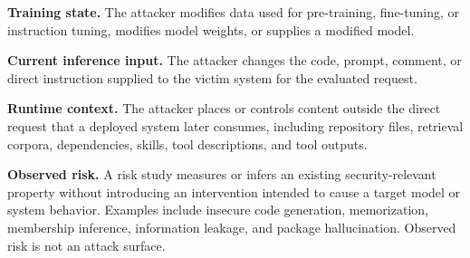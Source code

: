 \documentclass[acmsmall,screen,review]{acmart}
\begin{document}
\noindent\textbf{Training state.}
The attacker modifies data used for pre-training, fine-tuning, or instruction tuning, modifies model weights, or supplies a modified model.

\noindent\textbf{Current inference input.}
The attacker changes the code, prompt, comment, or direct instruction supplied to the victim system for the evaluated request.

\noindent\textbf{Runtime context.}
The attacker places or controls content outside the direct request that a deployed system later consumes, including repository files, retrieval corpora, dependencies, skills, tool descriptions, and tool outputs.

\noindent\textbf{Observed risk.}
A risk study measures or infers an existing security-relevant property without introducing an intervention intended to cause a target model or system behavior. Examples include insecure code generation, memorization, membership inference, information leakage, and package hallucination. Observed risk is not an attack surface.
\end{document}
